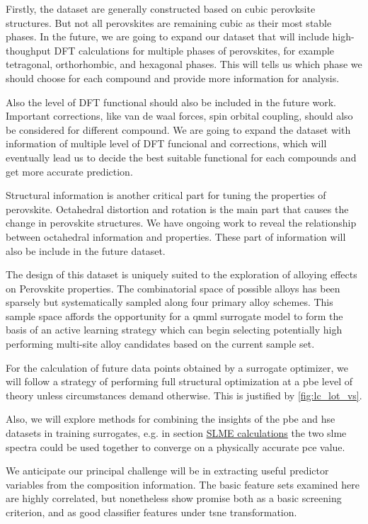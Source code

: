 \documentclass[twoside, twocolumn, 9pt, draft]{article}
\begin{document}
Firstly, the dataset are generally constructed based on cubic perovksite structures. But not all perovskites are remaining cubic as their most stable phases. In the future, we are going to expand our dataset that will include high-thoughput DFT calculations for multiple phases of perovskites, for example tetragonal, orthorhombic, and hexagonal phases. This will tells us which phase we should choose for each compound and provide more information for analysis.

Also the level of DFT functional should also be included in the future work. Important corrections, like van de waal forces, spin orbital coupling, should also be considered for different compound. We are going to expand the dataset with information of multiple level of DFT funcional and corrections, which will eventually lead us to decide the best suitable functional for each compounds and get more accurate prediction.

Structural information is another critical part for tuning the properties of perovskite. Octahedral distortion and rotation is the main part that causes the change in perovskite structures. We have ongoing work to reveal the relationship between octahedral information and properties. These part of information will also be include in the future dataset.

The design of this dataset is uniquely suited to the exploration of
alloying effects on Perovskite properties. The combinatorial space of
possible alloys has been sparsely but systematically sampled along
four primary alloy schemes. This sample space affords the opportunity
for a \gls{qmml} surrogate model to form the basis of an
active learning strategy which can begin selecting potentially high
performing multi-site alloy candidates based on the current sample
set.

For the calculation of future data points obtained by a surrogate
optimizer, we will follow a strategy of performing full structural
optimization at a \acrshort{pbe} level of theory unless
circumstances demand otherwise. This is justified by
\ref{fig:lc_lot_vs}.

Also, we will explore methods for combining the insights of the
\acrshort{pbe} and \acrshort{hse} datasets in training
surrogates, e.g. in section \hyperref[sec:orga002246]{SLME calculations} the two
\gls{slme} spectra could be used together to converge on a
physically accurate \acrshort{pce} value.

We anticipate our principal challenge will be in extracting useful
predictor variables from the composition information. The basic
feature sets examined here are highly correlated, but nonetheless show
promise both as a basic screening criterion, and as good classifier
features under \gls{tsne} transformation.
\end{document}
